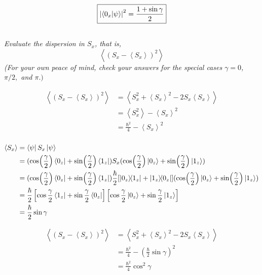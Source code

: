 \documentclass{article}
\begin{document}
$$\boxed{\left|\braket{0_x}{\psi}\right|^2= \frac{1+\sin \gamma}{2}}$$

\subsection{}
\textit{Evaluate the dispersion in $S_{x}$, that is,
$$
\left\langle\left(S_{x}-\left\langle S_{x}\right\rangle\right)^{2}\right\rangle
$$
(For your own peace of mind, check your answers for the special cases $\gamma=0$, $\pi / 2,$ and $\pi .)$}

\begin{align*}
    \left\langle\left(S_{x}-\left\langle S_{x}\right\rangle\right)^{2}\right\rangle &= \left\langle S_{x}^2 +\left\langle S_{x}\right\rangle^2 - 2S_{x}\left\langle S_{x}\right\rangle\right\rangle\\
    &= \left\langle S_{x}^{2}\right\rangle-\left\langle S_{x}\right\rangle^{2}\\
    &= \frac{\hbar^2}{4}-\left\langle S_{x}\right\rangle^{2}\\
\end{align*}

\begin{align*}
\left\langle S_{x}\right\rangle &=\bra{\psi}  S_x  \ket{\psi} \\
&=  (\cos (\frac{\gamma }{2}) \bra{0_z} + \sin (\frac{\gamma }{2}) \bra{1_z}) S_x (\cos (\frac{\gamma }{2}) \ket{0_z} + \sin (\frac{\gamma }{2}) \ket{1_z}) \\ 
&=  (\cos (\frac{\gamma }{2}) \bra{0_z} + \sin (\frac{\gamma }{2})\bra{1_z})\frac{\hbar}{2}[\ketbra{0_z}{1_z}+\ketbra{1_z}{0_z}](\cos (\frac{\gamma }{2}) \ket{0_z} + \sin (\frac{\gamma }{2}) \ket{1_z}) \\
&= \frac{\hbar}{2}\left[\cos \frac{\gamma}{2}\bra{1_z}+\sin \frac{\gamma}{2}\bra{0_z} \right]\left[\cos \frac{\gamma}{2}\ket{0_z}+\sin \frac{\gamma}{2}\ket{1_z}\right] \\
&= \frac{\hbar}{2} \sin \gamma
\end{align*}

\begin{align*}
    \left\langle\left(S_{x}-\left\langle S_{x}\right\rangle\right)^{2}\right\rangle &= \left\langle S_{x}^2 +\left\langle S_{x}\right\rangle^2 - 2S_{x}\left\langle S_{x}\right\rangle\right\rangle\\
    &= \frac{\hbar^2}{4}-\left( \frac{\hbar}{2} \sin \gamma \right)^{2}\\
    &= \frac{\hbar^2}{4} \cos^2 \gamma
\end{align*}
\end{document}
